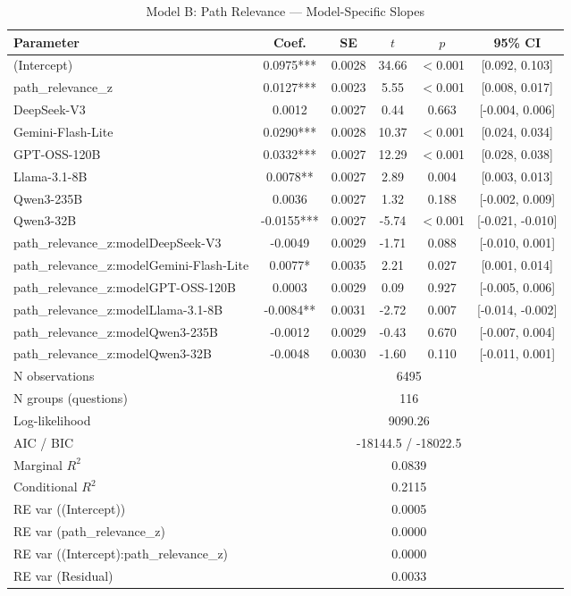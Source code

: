\begin{table}[htbp]
\centering
\small
\caption{Model B: Path Relevance --- Model-Specific Slopes}
\label{tab:lme_model_b_table}
\begin{tabular}{lccccc}
\toprule
Parameter & Coef. & SE & $t$ & $p$ & 95\% CI \\
\midrule
  (Intercept) & 0.0975*** & 0.0028 & 34.66 & $<$0.001 & [0.092, 0.103] \\
  path\_relevance\_z & 0.0127*** & 0.0023 & 5.55 & $<$0.001 & [0.008, 0.017] \\
  DeepSeek-V3 & 0.0012 & 0.0027 & 0.44 & 0.663 & [-0.004, 0.006] \\
  Gemini-Flash-Lite & 0.0290*** & 0.0028 & 10.37 & $<$0.001 & [0.024, 0.034] \\
  GPT-OSS-120B & 0.0332*** & 0.0027 & 12.29 & $<$0.001 & [0.028, 0.038] \\
  Llama-3.1-8B & 0.0078** & 0.0027 & 2.89 & 0.004 & [0.003, 0.013] \\
  Qwen3-235B & 0.0036 & 0.0027 & 1.32 & 0.188 & [-0.002, 0.009] \\
  Qwen3-32B & -0.0155*** & 0.0027 & -5.74 & $<$0.001 & [-0.021, -0.010] \\
  path\_relevance\_z:modelDeepSeek-V3 & -0.0049 & 0.0029 & -1.71 & 0.088 & [-0.010, 0.001] \\
  path\_relevance\_z:modelGemini-Flash-Lite & 0.0077* & 0.0035 & 2.21 & 0.027 & [0.001, 0.014] \\
  path\_relevance\_z:modelGPT-OSS-120B & 0.0003 & 0.0029 & 0.09 & 0.927 & [-0.005, 0.006] \\
  path\_relevance\_z:modelLlama-3.1-8B & -0.0084** & 0.0031 & -2.72 & 0.007 & [-0.014, -0.002] \\
  path\_relevance\_z:modelQwen3-235B & -0.0012 & 0.0029 & -0.43 & 0.670 & [-0.007, 0.004] \\
  path\_relevance\_z:modelQwen3-32B & -0.0048 & 0.0030 & -1.60 & 0.110 & [-0.011, 0.001] \\
\midrule
  N observations & \multicolumn{5}{c}{6495} \\
  N groups (questions) & \multicolumn{5}{c}{116} \\
  Log-likelihood & \multicolumn{5}{c}{9090.26} \\
  AIC / BIC & \multicolumn{5}{c}{-18144.5 / -18022.5} \\
  Marginal $R^2$ & \multicolumn{5}{c}{0.0839} \\
  Conditional $R^2$ & \multicolumn{5}{c}{0.2115} \\
  RE var ((Intercept)) & \multicolumn{5}{c}{0.0005} \\
  RE var (path\_relevance\_z) & \multicolumn{5}{c}{0.0000} \\
  RE var ((Intercept):path\_relevance\_z) & \multicolumn{5}{c}{0.0000} \\
  RE var (Residual) & \multicolumn{5}{c}{0.0033} \\
\bottomrule
\end{tabular}
\end{table}
